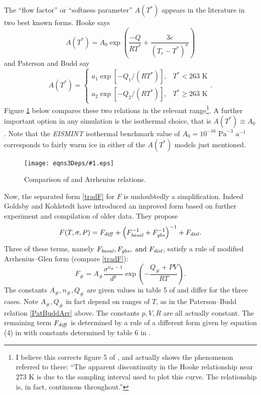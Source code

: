 \documentclass[12pt,final]{amsart}%
\theoremstyle{plain}
\theoremstyle{definition}
\theoremstyle{remark}
\newcommand{\regfigure}[2]{\texttt{[image: eqns3Deps/\#1.eps]}}
\begin{document}
The ``flow factor'' or ``softness parameter'' $A(T^*)$ appears in the literature in two best known forms.  Hooke \citep{Hooke} says
    $$A(T^*) = A_0 \exp\left(\frac{-Q}{R T^*} + \frac{3c}{(T_r - T^*)^\kappa}\right)$$
and Paterson and Budd \citep{PatersonBudd} say
\begin{equation}\label{PatBuddArr}
A(T^*) = \begin{cases} a_1 \exp\left[-Q_1/(R T^*)\right], &T^*<263 \text{ K} \\
a_2 \exp\left[-Q_2/(R T^*)\right], &T^*\ge 263 \text{ K} \end{cases}.
\end{equation}
Figure \ref{arrfig} below compares these two relations in the relevant range\footnote{I believe this corrects figure 5 of \citep{PayneBaldwin}, and actually shows the phenomenon referred to there: ``The apparent discontinuity in the Hooke relationship near 273 K is due to the sampling interval used to plot this curve.  The relationship is, in fact, continuous throughout.''}.  A further important option in any simulation is the isothermal choice, that is $A(T^*)\equiv A_0$.  Note that the \emph{EISMINT} isothermal benchmark \citep{EISMINT96} value of $A_0=10^{-16}$ $\text{Pa}^{-3}$ $\text{a}^{-1}$ corresponds to fairly warm ice in either of the $A(T^*)$ models just mentioned.
\begin{figure}[ht]
\regfigure{arrfig}{3}
\caption{Comparison of \citet{Hooke} and \citet{PatersonBudd} Arrhenius relations.}
\label{arrfig}
\end{figure}

Now, the separated form \eqref{tradF} for $F$ is undoubtedly a simplification.  Indeed Goldsby and Kohlstedt \citep{GoldsbyKohlstedt} have introduced an improved form based on further experiment and compilation of older data.  They propose
\begin{equation}\label{GKF}
F(T,\sigma,P)=F_{\text{\emph{diff}}} + \left(F_{\text{\emph{basal}}}^{-1} + F_{\text{\emph{gbs}}}^{-1}\right)^{-1} +F_{\text{\emph{disl}}}.
\end{equation}
Three of these terms, namely  $F_{\text{\emph{basal}}}, F_{\text{\emph{gbs}}}, \text{ and } F_{\text{\emph{disl}}}$, satisfy a rule of modified Arrhenius--Glen form (compare \eqref{tradF}):
    $$F_{\#}=A_{\#} \frac{\sigma^{n_{\#}-1}}{d^p} \exp\left(-\frac{Q_{\#}+PV}{RT}\right).$$
The constants $A_{\#},n_{\#},Q_{\#}$ are given values in table 5 of \citep{GoldsbyKohlstedt} and differ for the three cases.  Note $A_{\#},Q_{\#}$ in fact depend on ranges of $T$, as in the Paterson--Budd relation \eqref{PatBuddArr} above.  The constants $p, V, R$ are all actually constant.  The remaining term $F_{\text{\emph{diff}}}$ is determined by a rule of a different form given by equation (4) in \citep{GoldsbyKohlstedt} with constants determined by table 6 in \citep{GoldsbyKohlstedt}.
\end{document}
